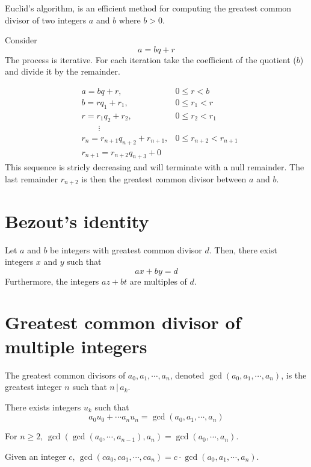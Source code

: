 \documentclass[preview]{standalone}
\newcommand{\divides}{\,|\,}
\begin{document}
Euclid's algorithm, is an efficient method for computing the greatest common divisor of two integers
\(a\) and \(b\) where \(b > 0\).

Consider
\[
    a = bq + r
\]
The process is iterative.
For each iteration take the coefficient of the quotient (\(b\)) and divide it by the remainder.

\begin{align*}
    &a = bq + r, &0 \leq r < b \\
    &b = rq_1 + r_1, &0 \leq r_1 < r \\
    &r = r_1q_2 + r_2, &0 \leq r_2 < r_1 \\
    \phantom{ } &\qquad \vdots & \\
    &r_n = r_{n+1}q_{n+2} + r_{n+1}, &0 \leq r_{n+2} < r_{n+1} \\
    &r_{n+1} = r_{n+2}q_{n+3} + 0&
\end{align*}
This sequence is stricly decreasing and will terminate with a null remainder.
The last remainder \(r_{n+2}\) is then the greatest common divisor between \(a\) and \(b\).

\section{Bezout's identity}

Let \(a\) and \(b\) be integers with greatest common divisor \(d\).
Then, there exist integers \(x\) and \(y\) such that
\[
    ax+by=d
\]
Furthermore, the integers \(az+bt\) are multiples of \(d\).

\section{Greatest common divisor of multiple integers}

The greatest common divisors of \(a_0, a_1, \cdots, a_n\), denoted \(\gcd(a_0, a_1, \cdots, a_n)\),
is the greatest integer \(n\) such that \(n \divides a_k\).

There exists integers \(u_k\) such that
\[
    a_0u_0 + \cdots a_nu_n = \gcd(a_0, a_1, \cdots, a_n)
\]

For \(n \geq 2\), \(\gcd(\gcd(a_0, \cdots, a_{n-1}), a_n) = \gcd(a_0, \cdots, a_n)\).

Given an integer \(c\), \(\gcd(ca_0, ca_1, \cdots, ca_n) = c \cdot \gcd(a_0, a_1, \cdots, a_n)\).
\end{document}
